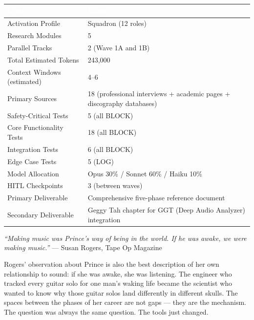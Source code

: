 \documentclass[11pt,letterpaper]{article}
\newcommand{\tableheader}[1]{\textbf{\sffamily\textcolor{white}{#1}}}
\begin{document}
\begin{center}
\begin{tabularx}{\textwidth}{L{5cm}X}
\toprule
{}
\tableheader{Metric} & \tableheader{Value} \\
\midrule
Activation Profile & Squadron (12 roles) \\
Research Modules & 5 \\
Parallel Tracks & 2 (Wave 1A and 1B) \\
Total Estimated Tokens & 243,000 \\
Context Windows (estimated) & 4--6 \\
Primary Sources & 18 (professional interviews + academic pages + discography databases) \\
Safety-Critical Tests & 5 (all BLOCK) \\
Core Functionality Tests & 18 (all BLOCK) \\
Integration Tests & 6 (all BLOCK) \\
Edge Case Tests & 5 (LOG) \\
Model Allocation & Opus 30\% / Sonnet 60\% / Haiku 10\% \\
HITL Checkpoints & 3 (between waves) \\
Primary Deliverable & Comprehensive five-phase reference document \\
Secondary Deliverable & Geggy Tah chapter for GGT (Deep Audio Analyzer) integration \\
\bottomrule
\end{tabularx}
\end{center}

\vspace{2em}

\begin{quotebox}
\textit{``Making music was Prince's way of being in the world. If he was awake, we were making music.''} --- Susan Rogers, Tape Op Magazine

\vspace{0.8em}
Rogers' observation about Prince is also the best description of her own relationship to sound: if she was awake, she was listening. The engineer who tracked every guitar solo for one man's waking life became the scientist who wanted to know why those guitar solos land differently in different skulls. The spaces between the phases of her career are not gaps --- they are the mechanism. The question was always the same question. The tools just changed.
\end{quotebox}
\end{document}
